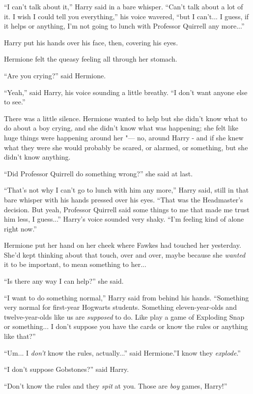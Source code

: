 ``I can't talk about it,'' Harry said in a bare whisper. ``Can't talk
about a lot of it. I wish I could tell you everything,'' his voice
wavered, ``but I can't... I guess, if it helps or anything, I'm not
going to lunch with Professor Quirrell any more...''

Harry put his hands over his face, then, covering his eyes.

Hermione felt the queasy feeling all through her stomach.

``Are you crying?'' said Hermione.

``Yeah,'' said Harry, his voice sounding a little breathy. ``I don't
want anyone else to see.''

There was a little silence. Hermione wanted to help but she didn't know
what to do about a boy crying, and she didn't know what was happening;
she felt like huge things were happening around her "--- no, around Harry -
and if she knew what they were she would probably be scared, or alarmed,
or something, but she didn't know anything.

``Did Professor Quirrell do something wrong?'' she said at last.

``That's not why I can't go to lunch with him any more,'' Harry said,
still in that bare whisper with his hands pressed over his eyes. ``That
was the Headmaster's decision. But yeah, Professor Quirrell said some
things to me that made me trust him less, I guess...'' Harry's
voice sounded very shaky. ``I'm feeling kind of alone right now.''

Hermione put her hand on her cheek where Fawkes had touched her
yesterday. She'd kept thinking about that touch, over and over, maybe
because she \emph{wanted} it to be important, to mean something to
her...

``Is there any way I can help?'' she said.

``I want to do something normal,'' Harry said from behind his hands.
``Something very normal for first-year Hogwarts students. Something
eleven-year-olds and twelve-year-olds like us are \emph{supposed} to do.
Like play a game of Exploding Snap or something... I don't suppose
you have the cards or know the rules or anything like that?''

``Um... I \emph{don't} know the rules, actually...'' said
Hermione.''I know they \emph{explode}.''

``I don't suppose Gobstones?'' said Harry.

``Don't know the rules and they \emph{spit} at you. Those are \emph{boy}
games, Harry!''

